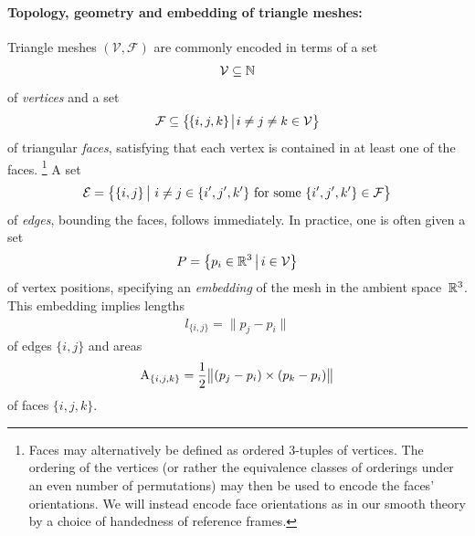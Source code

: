 \paragraph{Topology, geometry and embedding of triangle meshes:}
Triangle meshes $(\mathcal{V},\mathcal{F})$ are commonly encoded in terms of a set
\begin{align}
    \mathcal{V}\subseteq\mathbb{N}
\end{align}
of \emph{vertices} and a set
\begin{align}
    {\mathcal{F} \subseteq \big\{\mkern-2mu \{i,j,k\} \mkern2mu\big|\mkern2mu i\neq j\neq k \in\mathcal{V} \big\}}
\end{align}
of triangular \emph{faces},
satisfying that each vertex is contained in at least one of the faces.%
\footnote{
    Faces may alternatively be defined as ordered 3-tuples of vertices.
    The ordering of the vertices (or rather the equivalence classes of orderings under an even number of permutations) may then be used to encode the faces' orientations.
    We will instead encode face orientations as in our smooth theory by a choice of handedness of reference frames.
}
A set
\begin{align}
    \mathcal{E} = \big\{ \{i,j\} \,\big|\ i\neq j\in \{i',j',k'\} \textup{ for some } \{i',j',k'\} \in \mathcal{F} \big\}
\end{align}
of \emph{edges}, bounding the faces, follows immediately.
In practice, one is often given a set
\begin{align}
    P = \big\{ p_i \in \mathbb{R}^3 \,\big|\, i\in\mathcal{V} \big\}
\end{align}
of vertex positions, specifying an \emph{embedding} of the mesh in the ambient space~$\mathbb{R}^3$.
This embedding implies lengths
\begin{align}
    l_{\{i,j\}} = \lVert p_j-p_i \rVert
\end{align}
of edges $\{i,j\}$ and areas
\begin{align}
    \textup{A}_{\{i,j,k\}} = \frac{1}{2} \big\lVert {(p_j-p_i)} \times (p_k-p_i) \big\rVert
\end{align}
of faces $\{i,j,k\}$.


